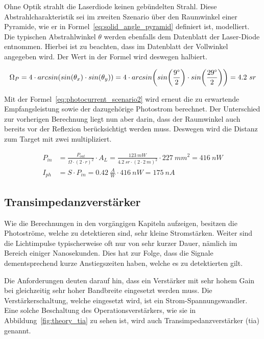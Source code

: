 Ohne Optik strahlt die Laserdiode keinen gebündelten Strahl. Diese Abstrahlcharakteristik sei im zweiten Szenario über
den Raumwinkel einer Pyramide, wie er in Formel~\ref{eq:solid_angle_pyramid} definiert ist, modelliert. Die typischen
Abstrahlwinkel $\theta$ werden ebenfalls dem Datenblatt der Laser-Diode entnommen. Hierbei ist zu beachten, dass im
Datenblatt der Vollwinkel angegeben wird. Der Wert in der Formel wird deswegen halbiert.

\begin{equation}\label{eq:solid_angle_pyramid}
    \Omega_{P} = 4 \cdot arcsin(sin(\theta_x) \cdot sin(\theta_y)) =  4 \cdot arcsin \parenth*{sin \parenth*{\frac{9\degree}{2}} \cdot sin \parenth*{\frac{29\degree}{2}}} = 4.2~sr
\end{equation}

Mit der Formel~\ref{eq:photocurrent_scenario2} wird erneut die zu erwartende Empfangsleistung sowie der dazugehörige
Photostrom berechnet. Der Unterschied zur vorherigen Berechnung liegt nun aber darin, dass der Raumwinkel auch bereits
vor der Reflexion berücksichtigt werden muss. Deswegen wird die Distanz zum Target mit zwei multipliziert.

\begin{equation}\label{eq:photocurrent_scenario2}
    \begin{split}
        P_{in} &= \frac{P_{out}}{\Omega \cdot (2 \cdot r)^2} \cdot A_{L} = \frac{123~mW}{4.2~sr \cdot (2 \cdot 2~m)^2} \cdot 227~mm^2 = 416~nW\\
        I_{ph} &= S \cdot P_{in} = 0.42~\frac{A}{W} \cdot 416~nW = 175~nA
    \end{split}
\end{equation}

\pagebreak

\subsection{Transimpedanzverstärker}

Wie die Berechnungen in den vorgängigen Kapiteln aufzeigen, besitzen die Photoströme, welche zu detektieren sind, sehr kleine
Stromstärken. Weiter sind die Lichtimpulse typischerweise oft nur von sehr kurzer Dauer, nämlich im Bereich einiger Nanosekunden.
Dies hat zur Folge, dass die Signale dementsprechend kurze Anstiegszeiten haben, welche es zu detektierten gilt.

Die Anforderungen deuten darauf hin, dass ein Verstärker mit sehr hohem Gain bei gleichzeitig sehr hoher Bandbreite eingesetzt werden muss.
Die Verstärkerschaltung, welche eingesetzt wird, ist ein Strom-Spannungswandler. Eine solche Beschaltung des Operationsverstärkers,
wie sie in Abbildung~\ref{fig:theory_tia} zu sehen ist, wird auch Transimpedanzverstärker (\acrshort{tia}) genannt.

